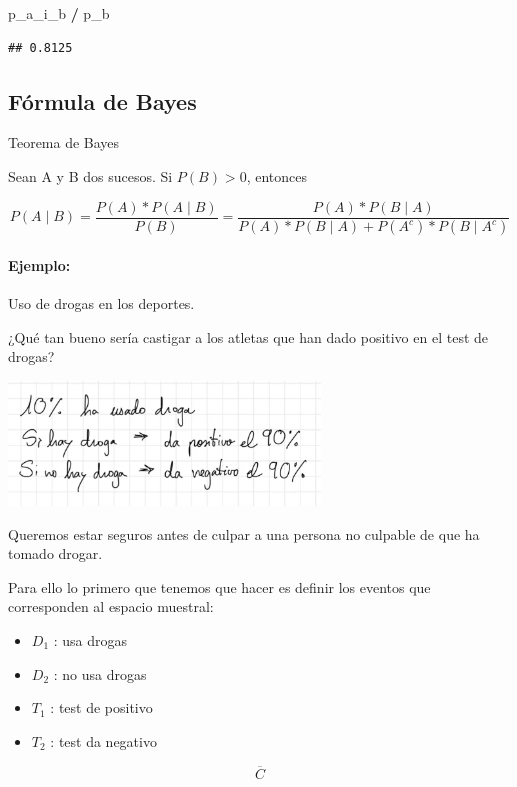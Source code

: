 \documentclass[
]{article}
\newenvironment{Shaded}{\begin{snugshade}}{\end{snugshade}}
\newcommand{\NormalTok}[1]{#1}
\newcommand{\OperatorTok}[1]{\textcolor[rgb]{0.81,0.36,0.00}{\textbf{#1}}}
\begin{document}
\begin{Shaded}
\begin{Highlighting}[]
\NormalTok{p\_a\_i\_b }\OperatorTok{/}\NormalTok{ p\_b}
\end{Highlighting}
\end{Shaded}

\begin{verbatim}
## 0.8125
\end{verbatim}

\hypertarget{fuxf3rmula-de-bayes}{%
\subsection{Fórmula de Bayes}\label{fuxf3rmula-de-bayes}}

Teorema de Bayes

Sean A y B dos sucesos. Si \(P(B) > 0\), entonces

\[
P(A \mid B) = \frac{P(A) * P(A \mid B)}{P(B)} = \frac{P(A) * P(B \mid A)}{P(A) * P(B \mid A) + P(A^c) * P(B \mid A^c)}
\]

\hypertarget{ejemplo}{%
\paragraph{Ejemplo:}\label{ejemplo}}

Uso de drogas en los deportes.

¿Qué tan bueno sería castigar a los atletas que han dado positivo en el
test de drogas?

\includegraphics[width=3.26042in,height=\textheight]{images/paste-1707571C.png}

Queremos estar seguros antes de culpar a una persona no culpable de que
ha tomado drogar.

Para ello lo primero que tenemos que hacer es definir los eventos que
corresponden al espacio muestral:

\begin{itemize}
\item
  \(D_{1}\) : usa drogas
\item
  \(D_{2}\) : no usa drogas
\item
  \(T_{1}\) : test de positivo
\item
  \(T_{2}\) : test da negativo
\end{itemize}

\[
\overline{C}
\]
\end{document}
